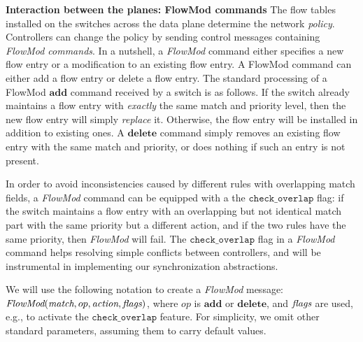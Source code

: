 \documentclass[conference]{sigcomm-alternate}
\newcommand{\add}{\textbf{add}\xspace}
\newcommand{\dele}{\textbf{delete}\xspace}
\newcommand{\FlowMod}{\emph{FlowMod}\xspace}
\newcommand{\match}{\emph{match}\xspace}
\newcommand{\action}{\emph{action}\xspace}
\newcommand{\flags}{\emph{flags}\xspace}
\newcommand{\checko}{\texttt{check\_overlap}\xspace}
\newcommand{\liron}[1]{\textit{\textcolor{mygreen}{[liron]: #1}}} %
\newcommand{\petr}[1]{\textit{\textcolor{blue}{[petr]: #1}}} %
\begin{document}
\vspace{1mm}
\noindent\textbf{Interaction between the planes: FlowMod commands}
The flow tables installed on the switches across the data plane
determine the network \emph{policy}.
Controllers can change the policy by sending
control messages containing \emph{FlowMod commands}.
In a nutshell, a \emph{FlowMod} command either specifies a new flow entry or
a modification to an existing flow entry.
%
%
%
%
A FlowMod command can either add a flow entry or delete a flow entry.
The standard processing of a FlowMod $\add$ command received by a switch is
as follows.
If the switch already maintains a flow entry with \emph{exactly} the
same match and priority level, then the new flow entry will simply \emph{replace} it.
Otherwise, the flow entry will be installed in addition to existing
ones.
A $\dele$ command simply removes an existing flow entry with the same
match and priority,  or does nothing if such an entry is not present.


In order to avoid inconsistencies caused by different rules with
overlapping match fields, a \emph{FlowMod} command can be equipped with a the $\checko$ flag:
if the switch maintains a flow entry with an overlapping but not
identical match part with the same priority but a different action,
 and if the two rules have the same priority, then
\emph{FlowMod} will fail.
The $\checko$ flag in a \emph{FlowMod} command helps resolving simple
conflicts between controllers, and will be instrumental
in implementing our synchronization abstractions.

We will use the following notation to create a \emph{FlowMod} message:
$\FlowMod(\match, op, \action, \flags)$, where
$op$ is $\add$ or $\dele$, and $\flags$ are used, e.g.,  to activate the $\checko$
feature.
For simplicity, we omit other standard parameters, assuming them to carry
default values.
\end{document}
